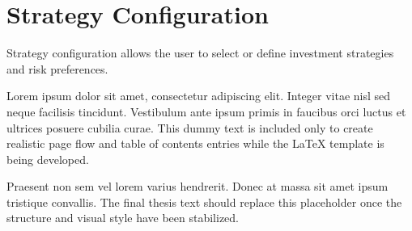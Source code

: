 \section{Strategy Configuration}

Strategy configuration allows the user to select or define investment strategies and risk preferences.

Lorem ipsum dolor sit amet, consectetur adipiscing elit. Integer vitae nisl sed neque facilisis tincidunt. Vestibulum ante ipsum primis in faucibus orci luctus et ultrices posuere cubilia curae. This dummy text is included only to create realistic page flow and table of contents entries while the LaTeX template is being developed.

Praesent non sem vel lorem varius hendrerit. Donec at massa sit amet ipsum tristique convallis. The final thesis text should replace this placeholder once the structure and visual style have been stabilized.

